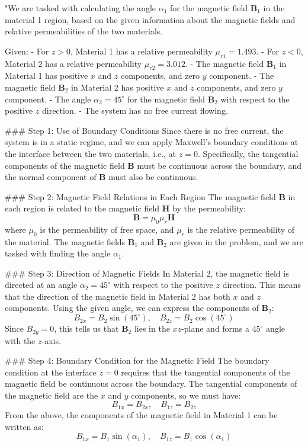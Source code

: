 "We are tasked with calculating the angle $\alpha_1$ for the magnetic field $\mathbf{B}_1$ in the material 1 region, based on the given information about the magnetic fields and relative permeabilities of the two materials.

Given:
- For $z > 0$, Material 1 has a relative permeability $\mu_{r1} = 1.493$.
- For $z < 0$, Material 2 has a relative permeability $\mu_{r2} = 3.012$.
- The magnetic field $\mathbf{B}_1$ in Material 1 has positive $x$ and $z$ components, and zero $y$ component.
- The magnetic field $\mathbf{B}_2$ in Material 2 has positive $x$ and $z$ components, and zero $y$ component.
- The angle $\alpha_2 = 45^\circ$ for the magnetic field $\mathbf{B}_2$ with respect to the positive $z$ direction.
- The system has no free current flowing.

### Step 1: Use of Boundary Conditions
Since there is no free current, the system is in a static regime, and we can apply Maxwell's boundary conditions at the interface between the two materials, i.e., at $z = 0$. Specifically, the tangential components of the magnetic field $\mathbf{B}$ must be continuous across the boundary, and the normal component of $\mathbf{B}$ must also be continuous.

### Step 2: Magnetic Field Relations in Each Region
The magnetic field $\mathbf{B}$ in each region is related to the magnetic field $\mathbf{H}$ by the permeability:
\[
\mathbf{B} = \mu_0 \mu_r \mathbf{H}
\]
where $\mu_0$ is the permeability of free space, and $\mu_r$ is the relative permeability of the material. The magnetic fields $\mathbf{B}_1$ and $\mathbf{B}_2$ are given in the problem, and we are tasked with finding the angle $\alpha_1$.

### Step 3: Direction of Magnetic Fields
In Material 2, the magnetic field is directed at an angle $\alpha_2 = 45^\circ$ with respect to the positive $z$ direction. This means that the direction of the magnetic field in Material 2 has both $x$ and $z$ components. Using the given angle, we can express the components of $\mathbf{B}_2$:
\[
B_{2x} = B_2 \sin(45^\circ), \quad B_{2z} = B_2 \cos(45^\circ)
\]
Since $B_{2y} = 0$, this tells us that $\mathbf{B}_2$ lies in the $xz$-plane and forms a $45^\circ$ angle with the $z$-axis.

### Step 4: Boundary Condition for the Magnetic Field
The boundary condition at the interface $z = 0$ requires that the tangential components of the magnetic field be continuous across the boundary. The tangential components of the magnetic field are the $x$ and $y$ components, so we must have:
\[
B_{1x} = B_{2x}, \quad B_{1z} = B_{2z}
\]
From the above, the components of the magnetic field in Material 1 can be written as:
\[
B_{1x} = B_1 \sin(\alpha_1), \quad B_{1z} = B_1 \cos(\alpha_1)
\]

